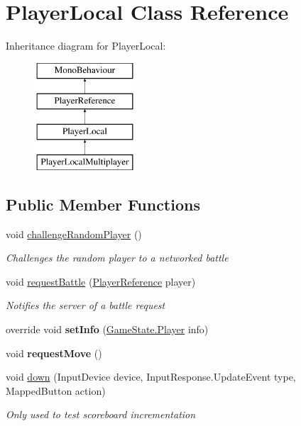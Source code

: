 \hypertarget{class_player_local}{\section{Player\-Local Class Reference}
\label{class_player_local}
}
Inheritance diagram for Player\-Local\-:\begin{figure}[H]
\begin{center}
\leavevmode
\includegraphics[height=4.000000cm]{class_player_local}
\end{center}
\end{figure}
\subsection*{Public Member Functions}
\begin{DoxyCompactItemize}
\item 
void \hyperlink{class_player_local_aa5c459588b976499120386eda1c1fac0}{challenge\-Random\-Player} ()
\begin{DoxyCompactList}\small\item\em Challenges the random player to a networked battle \end{DoxyCompactList}\item 
void \hyperlink{class_player_local_a5344425e801a7f02419bf29ede2cb2af}{request\-Battle} (\hyperlink{class_player_reference}{Player\-Reference} player)
\begin{DoxyCompactList}\small\item\em Notifies the server of a battle request \end{DoxyCompactList}\item 
\hypertarget{class_player_local_a811782eb0815d88b3a1e5c8d23ee4903}{override void {\bfseries set\-Info} (\hyperlink{class_game_state_1_1_player}{Game\-State.\-Player} info)}\label{class_player_local_a811782eb0815d88b3a1e5c8d23ee4903}

\item 
\hypertarget{class_player_local_a71d5b41f860d3f8841f58a11aff1a6c3}{void {\bfseries request\-Move} ()}\label{class_player_local_a71d5b41f860d3f8841f58a11aff1a6c3}

\item 
void \hyperlink{class_player_local_ab718bcb062155f6de683dc8e78a799ba}{down} (Input\-Device device, Input\-Response.\-Update\-Event type, Mapped\-Button action)
\begin{DoxyCompactList}\small\item\em Only used to test scoreboard incrementation \end{DoxyCompactList}\end{DoxyCompactItemize}
